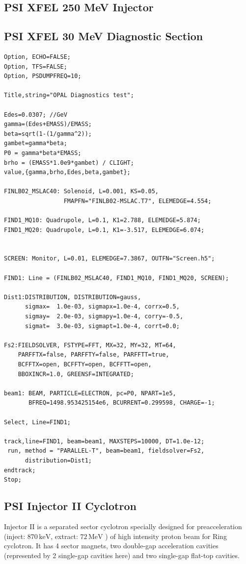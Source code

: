 \subsection{PSI XFEL 250 MeV Injector}
\label{sec:felinj}
\clearpage

\subsection{PSI XFEL 30 MeV Diagnostic Section}
\label{sec:feldiagsec1}
\begin{fmpage}
\footnotesize
\begin{verbatim} 
Option, ECHO=FALSE;
Option, TFS=FALSE;
Option, PSDUMPFREQ=10;

Title,string="OPAL Diagnostics test";

Edes=0.0307; //GeV
gamma=(Edes+EMASS)/EMASS;
beta=sqrt(1-(1/gamma^2));
gambet=gamma*beta;
P0 = gamma*beta*EMASS;
brho = (EMASS*1.0e9*gambet) / CLIGHT;
value,{gamma,brho,Edes,beta,gambet};

FINLB02_MSLAC40: Solenoid, L=0.001, KS=0.05, 
                 FMAPFN="FINLB02-MSLAC.T7", ELEMEDGE=4.554;

FIND1_MQ10: Quadrupole, L=0.1, K1=2.788, ELEMEDGE=5.874;
FIND1_MQ20: Quadrupole, L=0.1, K1=-3.517, ELEMEDGE=6.074;


SCREEN: Monitor, L=0.01, ELEMEDGE=7.3867, OUTFN="Screen.h5";

FIND1: Line = (FINLB02_MSLAC40, FIND1_MQ10, FIND1_MQ20, SCREEN);

Dist1:DISTRIBUTION, DISTRIBUTION=gauss,
      sigmax=  1.0e-03, sigmapx=1.0e-4, corrx=0.5,
      sigmay=  2.0e-03, sigmapy=1.0e-4, corry=-0.5,
      sigmat=  3.0e-03, sigmapt=1.0e-4, corrt=0.0;

Fs2:FIELDSOLVER, FSTYPE=FFT, MX=32, MY=32, MT=64, 
    PARFFTX=false, PARFFTY=false, PARFFTT=true,
    BCFFTX=open, BCFFTY=open, BCFFTT=open,
    BBOXINCR=1.0, GREENSF=INTEGRATED;

beam1: BEAM, PARTICLE=ELECTRON, pc=P0, NPART=1e5, 
       BFREQ=1498.953425154e6, BCURRENT=0.299598, CHARGE=-1;

Select, Line=FIND1;

track,line=FIND1, beam=beam1, MAXSTEPS=10000, DT=1.0e-12;
 run, method = "PARALLEL-T", beam=beam1, fieldsolver=Fs2, 
      distribution=Dist1;
endtrack;
Stop;
\end{verbatim}
\end{fmpage}

\subsection{PSI  Injector II Cyclotron}
\label{sec:inj2}
Injector II is a separated sector cyclotron specially designed for preacceleration (inject: $870\,\mathrm{keV}$, extract: $72\,\mathrm{MeV}$ )
of high intensity proton beam for Ring cyclotron. It has 4 sector magnets, two double-gap acceleration cavities 
(represented by 2 single-gap cavities here) and two single-gap flat-top cavities.  

